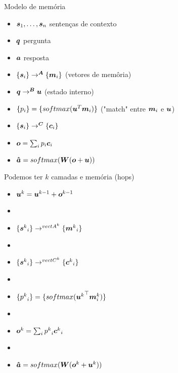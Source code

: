 \documentclass[10pt]{beamer}
\begin{document}
\begin{frame}{Modelo de memória}
\begin{itemize}
\item $\bm{s}_1, \dots, \bm{s}_n$ sentenças de contexto
\item $\bm{q}$ pergunta
\item $\bm{a}$ resposta
\item $\{ \bm{s}_i\} \rightarrow^{\bm{A}} \{ \bm{m}_i\}$  (vetores de memôria)
\item $\bm{q} \rightarrow^{\bm{B}} \bm{u}$  (estado interno)
\item $\{ p_i\} = \{ softmax(\bm{u}^{T}\bm{m}_i)\}$  ("match" entre $\bm{m}_i$ e $\bm{u}$)
\item $\{ \bm{s}_i\} \rightarrow^{\bm{C}} \{ \bm{c}_i\}$
\item $\bm{o}= \sum_{i} p_i \bm{c}_i$
\item $\bm{\hat{a}}= softmax(\bm{W}(\bm{o} + \bm{u}))$
\end{itemize}
\end{frame}


\begin{frame}{ Podemos ter $k$ camadas e memória (hops)}
\begin{itemize}
\item $\bm{u}^{k} = \bm{u}^{k-1} + \bm{o}^{k-1}$
\item[]
\item $\{ {\bm{s}^{k}}_i\} \rightarrow^{{vect{A}^{k}}} \{ {\bm{m}^{k}}_i\}$
\item[]
\item $\{ {\bm{s}^{k}}_i\} \rightarrow^{{vect{C}^{k}}} \{ {\bm{c}^{k}}_i\}$
\item[]
\item $\{{p^{k}}_i\} = \{ softmax({\bm{u}^{k}}^{\top} {\bm{m}^{k}_{i}})\}$
\item[]
\item $\bm{o}^{k}= \sum_{i} {p^{k}}_i {\bm{c}^{k}}_i$
\item[]
\item $\bm{\hat{a}}= softmax(\bm{W}(\bm{o}^{k} + \bm{u}^{k}))$
\end{itemize}
\end{frame}
\end{document}

